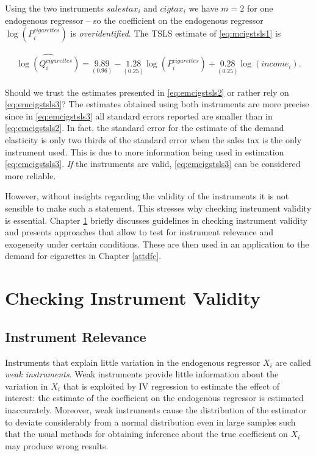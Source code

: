 \documentclass[
  14pt,
]{memoir}
\begin{document}
Using the two instruments \(salestax_i\) and \(cigtax_i\) we have \(m=2\) for one endogenous regressor -- so the coefficient on the endogenous regressor \(\log(P_i^{cigarettes})\) is \emph{overidentified}. The TSLS estimate of \eqref{eq:mcigstsls1} is

\begin{align}
\widehat{\log(Q_i^{cigarettes})} = \underset{(0.96)}{9.89} - \underset{(0.25)}{1.28} \log(P_i^{cigarettes}) + \underset{(0.25)}{0.28} \log(income_i). \label{eq:emcigstsls3}
\end{align}

Should we trust the estimates presented in \eqref{eq:emcigstsls2} or rather rely on \eqref{eq:emcigstsls3}? The estimates obtained using both instruments are more precise since in \eqref{eq:emcigstsls3} all standard errors reported are smaller than in \eqref{eq:emcigstsls2}. In fact, the standard error for the estimate of the demand elasticity is only two thirds of the standard error when the sales tax is the only instrument used. This is due to more information being used in estimation \eqref{eq:emcigstsls3}. \emph{If} the instruments are valid, \eqref{eq:emcigstsls3} can be considered more reliable.

However, without insights regarding the validity of the instruments it is not sensible to make such a statement. This stresses why checking instrument validity is essential. Chapter \ref{civ} briefly discusses guidelines in checking instrument validity and presents approaches that allow to test for instrument relevance and exogeneity under certain conditions. These are then used in an application to the demand for cigarettes in Chapter \ref{attdfc}.

\hypertarget{civ}{%
\section{Checking Instrument Validity}\label{civ}}

\hypertarget{instrument-relevance}{%
\subsection{Instrument Relevance}\label{instrument-relevance}}

Instruments that explain little variation in the endogenous regressor \(X_i\) are called \emph{weak instruments}. Weak instruments provide little information about the variation in \(X_i\) that is exploited by IV regression to estimate the effect of interest: the estimate of the coefficient on the endogenous regressor is estimated inaccurately. Moreover, weak instruments cause the distribution of the estimator to deviate considerably from a normal distribution even in large samples such that the usual methods for obtaining inference about the true coefficient on \(X_i\) may produce wrong results.
\end{document}
